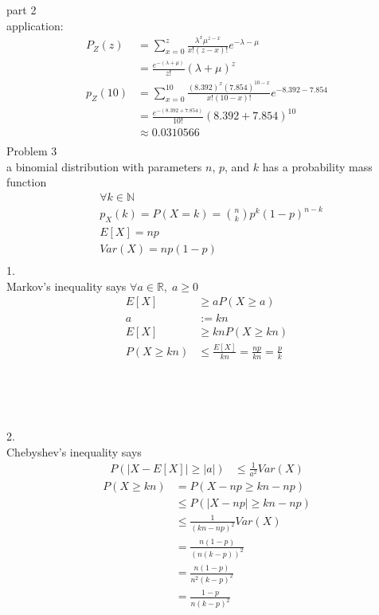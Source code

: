 \documentclass[12pt,border=4pt,multi]{article} %
\begin{document}
\newpage
\noindent
part 2\\
application:
\begin{align*}
P_Z(z) &= \sum_{x = 0}^{z} \frac{\lambda^x \mu^{z - x}}{x!(z - x)!}e^{-\lambda - \mu}\\
&= \frac{e^{-(\lambda + \mu)}}{z!}(\lambda + \mu)^z\\
p_Z(10) &= \sum_{x = 0}^{10} \frac{(8.392)^x (7.854)^{10 - x}}{x!(10 - x)!}e^{-8.392 - 7.854}\\
&= \boxed{\frac{e^{-(8.392 + 7.854)}}{10!}(8.392 + 7.854)^{10}}\\
&\approx \boxed{0.0310566}\\
\end{align*}
\newpage
\noindent
Problem 3\\
a binomial distribution with parameters $n$, $p$, and $k$ has a probability mass function
\begin{align*}
&\forall k \in \mathbb{N}\\
&p_X(k) = P(X = k) = \binom{n}{k}p^k (1 - p)^{n - k}\\
&E[X] = np\\
&Var(X) = np(1 - p)\\
\end{align*}
1.\\
Markov's inequality says $\forall a \in \mathbb{R},\; a \geq 0$  
\begin{align*}
E[X] &\geq aP(X \geq a)\\
a &:= kn\\
E[X] &\geq knP(X \geq kn)\\
P(X \geq kn) &\leq \frac{E[X]}{kn} = \frac{np}{kn} = \boxed{\frac{p}{k}}\\
\end{align*}
\\
\\
\\
\\
2.\\
Chebyshev's inequality says
\begin{align*}
P(|X - E[X]| \geq |a|) &\leq \frac{1}{a^2} Var(X)
\end{align*}
\begin{align*}
P(X \geq kn) &= P(X - np \geq kn - np)\\
&\leq P(|X - np| \geq kn - np)\\
&\leq \frac{1}{(kn - np)^2} Var(X)\\
&= \frac{n(1 - p)}{(n(k - p))^2}\\
&= \frac{n(1 - p)}{n^2(k - p)^2}\\
&= \boxed{\frac{1 - p}{n(k - p)^2}}\\
\end{align*}
\end{document}
